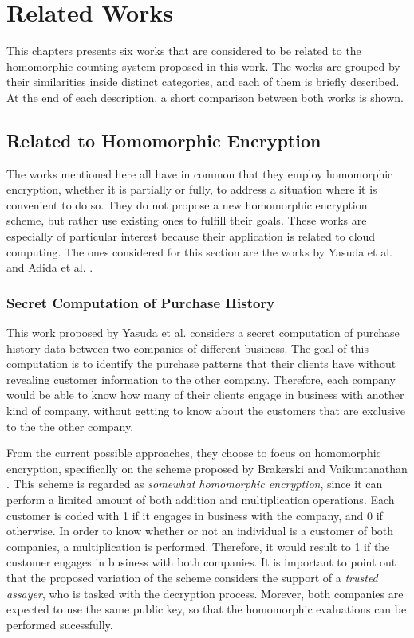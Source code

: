 \chapter{Related Works}
\label{relatedWorks}

This chapters presents six works that are considered to be related to the homomorphic counting system proposed in this work. The works are grouped by their similarities inside distinct categories, and each of them is briefly described. At the end of each description, a short comparison between both works is shown. 

\section{{Related to Homomorphic Encryption}}
The works mentioned here all have in common that they employ homomorphic encryption, whether it is partially or fully, to address a situation where it is convenient to do so. They do not propose a new homomorphic encryption scheme, but rather use existing ones to fulfill their goals. These works are especially of particular interest because their application is related to cloud computing. The ones considered for this section are the works by Yasuda et al. \cite{Yasuda:2015:SDD:2732516.2732521, yasuda2014} and Adida et al. \cite{adida2008helios}.

\subsection{Secret Computation of Purchase History}
This work proposed by Yasuda et al. \cite{yasuda2014} considers a secret computation of purchase history data between two companies of different business. The goal of this computation is to identify the purchase patterns that their clients have without revealing customer information to the other company. Therefore, each company would be able to know how many of their clients engage in business with another kind of company, without getting to know about the customers that are exclusive to the the other company.

From the current possible approaches, they choose to focus on homomorphic encryption, specifically on the scheme proposed by Brakerski and Vaikuntanathan \cite{cryptoeprint:2011:277}. This scheme is regarded as \emph{somewhat homomorphic encryption}, since it can perform a limited amount of both addition and multiplication operations. Each customer is coded with 1 if it engages in business with the company, and 0 if otherwise. In order to know whether or not an individual is a customer of both companies, a multiplication is performed. Therefore, it would result to 1 if the customer engages in business with both companies. It is important to point out that the proposed variation of the scheme considers the support of a \emph{trusted assayer}, who is tasked with the decryption process. Morever, both companies are expected to use the same public key, so that the homomorphic evaluations can be performed sucessfully.

